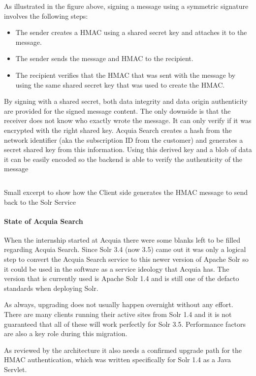 As illustrated in the figure above, signing a message using a symmetric signature involves the following steps:

\begin{itemize}
\item The sender creates a HMAC using a shared secret key and attaches it to the message.
\item The sender sends the message and HMAC to the recipient.
\item The recipient verifies that the HMAC that was sent with the message by using the same shared secret key that was used to create the HMAC.
\end{itemize}

By signing with a shared secret, both data integrity and data origin authenticity are provided for the signed message content. The only downside is that the receiver does not know who exactly wrote the message. It can only verify if it was encrypted with the right shared key. Acquia Search creates a hash from the network identifier (aka the subscription ID from the customer) and generates a secret shared key from this information. Using this derived key and a blob of data it can be easily encoded so the backend is able to verify the authenticity of the message

\inputminted[fontsize=\scriptsize,linenos]{php}{./code_examples/hmac_snippet.php}
\caption{Small excerpt to show how the Client side generates the HMAC message to send back to the Solr Service}

\paragraph{State of Acquia Search}
When the internship started at Acquia there were some blanks left to be filled regarding Acquia Search. Since Solr 3.4 (now 3.5) came out it was only a logical step to convert the Acquia Search service to this newer version of Apache Solr so it could be used in the software as a service ideology that Acquia has. The version that is currently used is Apache Solr 1.4 and is still one of the defacto standards when deploying Solr.

As always,  upgrading does not usually happen overnight without any effort. There are many clients running their active sites from Solr 1.4 and it is not guaranteed that all of these will work perfectly for Solr 3.5. Performance factors are also a key role during this migration. 

As reviewed by the architecture it also needs a confirmed upgrade path for the HMAC authentication, which was written specifically for Solr 1.4 as a Java Servlet.

